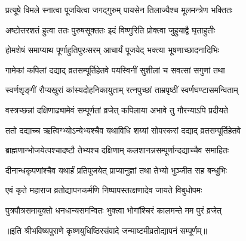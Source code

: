 \twolineshloka
{प्रत्यूषे विमले स्नात्वा पूजयित्वा जगद्गुरुम्}
{पायसेन तिलाज्यैश्च मूलमन्त्रेण भक्तितः}

\twolineshloka
{अष्टोत्तरशतं हुत्वा ततः पुरुषसूक्ततः}
{इदं विष्णुरिति प्रोक्त्वा जुहुयाद्वै घृताहुतीः}

\twolineshloka
{होमशेषं समाप्याथ पूर्णाहुतिपुरःसरम्}
{आचार्यं पूजयेद् भक्त्या भूषणाच्छादनादिभिः}

\twolineshloka
{गामेकां कपिलां दद्याद् व्रतसम्पूर्तिहेतवे}
{पयस्विनीं सुशीलां च सवत्सां सगुणां तथा}

\twolineshloka
{स्वर्णशृङ्गीं रौप्यखुरां कांस्यदोहनिकायुताम्}
{रत्नपुच्छां ताम्रपृष्ठीं स्वर्णघण्टासमन्विताम्}

\twolineshloka
{वस्त्रच्छन्नां दक्षिणाढ्यामेवं सम्पूर्णतां व्रजेत्}
{कपिलाया अभावे तु गौरन्याऽपि प्रदीयते}

\twolineshloka
{ततो दद्याच्च ऋत्विग्भ्योऽन्येभ्यश्चैव यथाविधि}
{शय्यां सोपस्करां दद्याद् व्रतसम्पूर्तिहेतवे}

\twolineshloka
{ब्राह्मणान्भोजयेत्पश्चादष्टौ तेभ्यश्च दक्षिणाम्}
{कलशानन्नसम्पूर्णान्दद्याच्चैव समाहितः}

\twolineshloka
{दीनान्धकृपणांश्चैव यथार्हं प्रतिपूजयेत्}
{प्राप्यानुज्ञां तथा तेभ्यो भुञ्जीत सह बन्धुभिः}

\twolineshloka
{एवं कृते महाराज व्रतोद्यापनकर्मणि}
{निष्पापस्तत्क्षणादेव जायते विबुधोपमः}

\twolineshloka
{पुत्रपौत्रसमायुक्तो धनधान्यसमन्वितः}
{भुक्त्वा भोगांश्चिरं कालमन्ते मम पुरं व्रजेत्}

॥इति श्रीभविष्यपुराणे कृष्णयुधिष्ठिरसंवादे जन्माष्टमीव्रतोद्यापनं सम्पूर्णम्॥

\endgroup
